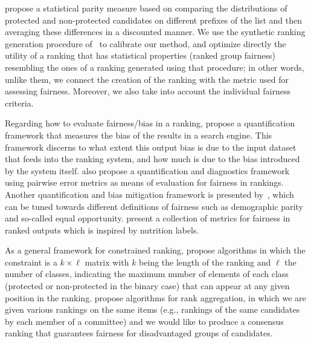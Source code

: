 \citet{yang2016measuring} propose a statistical parity measure based on comparing the distributions of protected and non-protected candidates on different prefixes of the list and then averaging these differences in a discounted manner.
%
%
%
We use the synthetic ranking generation procedure of~\citet{yang2016measuring} to calibrate our method, and optimize directly the utility of a ranking that has statistical properties (ranked group fairness) resembling the ones of a ranking generated using that procedure; in other words, unlike them, we connect the creation of the ranking with the metric used for assessing fairness.
Moreover, we also take into account the individual fairness criteria.

Regarding how to evaluate fairness/bias in a ranking,
\citet{kulshrestha_2017_quantifying} propose a quantification framework that measures the bias of the results in a search engine.
This framework discerns to what extent this output bias is due to the input dataset that feeds into the ranking system, and how much is due to the bias introduced by the system itself.
%
\citet{kuhlman2019fare} also propose a quantification and diagnostics framework using pairwise error metrics as means of evaluation for fairness in rankings.
%
Another quantification and bias mitigation framework is presented by~\citet{geyik2019fairness}, which can be tuned towards different definitions of fairness such as demographic parity and so-called equal opportunity.
%
\citet{yang2018nutritional} present a collection of metrics for fairness in ranked outputs which is inspired by nutrition labels.
%

As a general framework for constrained ranking, \citet{celis2017ranking} propose algorithms in which the constraint is a $k \times \ell$ matrix with $k$ being the length of the ranking and $\ell$ the number of classes, indicating the maximum number of elements of each class (protected or non-protected in the binary case) that can appear at any given position in the ranking.
%
\citet{kuhlman2020rank} propose algorithms for rank aggregation, in which we are given various rankings on the same items (e.g., rankings of the same candidates by each member of a committee) and we would like to produce a consensus ranking that guarantees fairness for disadvantaged groups of candidates.

